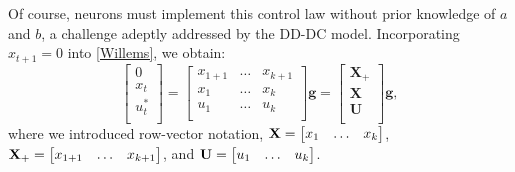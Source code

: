 \documentclass[9pt,twocolumn,twoside]{pnas-new}
\begin{document}
Of course, neurons must implement this control law without prior knowledge of $a$ and $b$, a challenge adeptly addressed by the DD-DC model. Incorporating $x_{t+1}=0$ into \eqref{Willems}, we obtain:
\begin{equation}
\label{one-step-zero}
\begin{bmatrix} 0\\  x_t\\ u^*_t\\\end{bmatrix}=\begin{bmatrix} x_{1+1} & \hdots & x_{k+1} \\  x_1 & \hdots & x_k\\ u_1 & \hdots & u_k\\\end{bmatrix} \mathbf{g}=\begin{bmatrix} \mathbf{X}_+\\  \mathbf{X}\\ \mathbf{U}\\\end{bmatrix} \mathbf{g},
\end{equation}
where we introduced row-vector notation, ${\bf X}=\begin{bmatrix}x_1 & \hdots & x_k\end{bmatrix}$, ${\bf X}_+= \begin{bmatrix} x_{1+1} & \hdots & x_{k+1}\end{bmatrix}$, and ${\bf U}=\begin{bmatrix}u_1 & \hdots & u_k\end{bmatrix}$.
\end{document}

